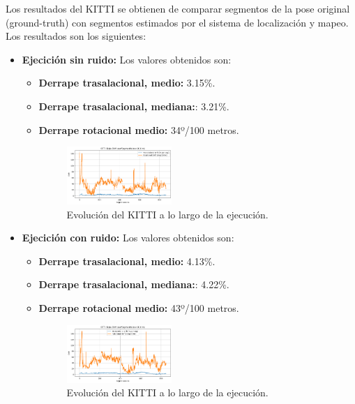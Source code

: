 \documentclass[12pt, a4paper, twoside]{article}
\begin{document}
Los resultados del KITTI se obtienen de comparar segmentos de la pose original (ground-truth) con segmentos estimados por el sistema de localización y mapeo. 
Los resultados son los siguientes:
\begin{itemize}
  \item \textbf{Ejecición sin ruido:} Los valores obtenidos son:
  \begin{itemize}
    \item \textbf{Derrape trasalacional, medio:} 3.15\%.
    \item \textbf{Derrape trasalacional, mediana:}: 3.21\%.
    \item \textbf{Derrape rotacional medio:} 34º/100 metros.
    \begin{figure}[h]
      \centering
        \includegraphics[width=0.4\textwidth]{kitty_clean.png}
      \caption{Evolución del KITTI a lo largo de la ejecución.}
    \end{figure} 
    \end{itemize}
  \item \textbf{Ejecición con ruido:} Los valores obtenidos son:
  \begin{itemize}
    \item \textbf{Derrape trasalacional, medio:} 4.13\%.
    \item \textbf{Derrape trasalacional, mediana:}: 4.22\%.
    \item \textbf{Derrape rotacional medio:} 43º/100 metros.
    \begin{figure}[h]
      \centering
        \includegraphics[width=0.4\textwidth]{kitty_noisy.png}
      \caption{Evolución del KITTI a lo largo de la ejecución.}
    \end{figure} 
  \end{itemize}
\end{itemize}
\end{document}
